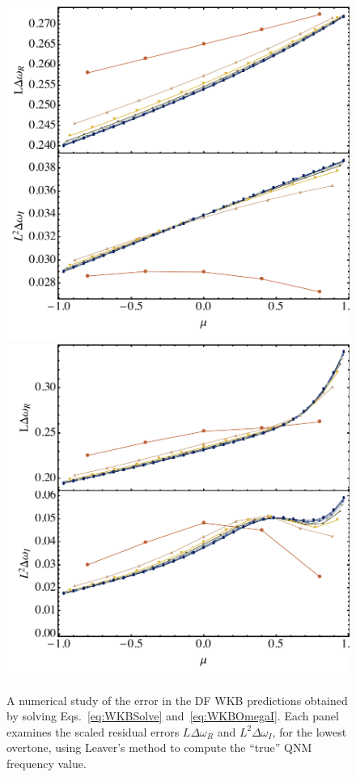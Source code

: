 \begin{refsection}
\begin{figure}[tb]
\includegraphics[width =1.0 \columnwidth]{chapter_extremal/etc/eikplot_Q_8_a_2_s_2.pdf} 
\includegraphics[width =1.0 \columnwidth]{chapter_extremal/etc/eikplot_Q_1_a_9_s_2.pdf}
\vspace{-5mm}
\caption{A numerical study of the error in the DF WKB predictions obtained by solving Eqs.~\eqref{eq:WKBSolve} and~\eqref{eq:WKBOmegaI}. Each panel examines the scaled residual errors $L\Delta \omega_{R}$ and $L^2\Delta \omega_{I}$, for the lowest overtone, using Leaver's method to compute the ``true'' QNM frequency value.
}
\end{figure}
\end{refsection}
